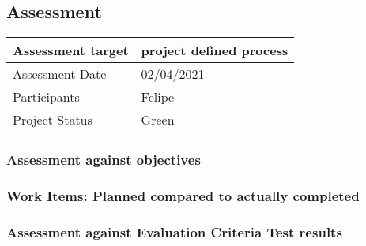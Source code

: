 \subsection*{Assessment}


\noindent\begin{tabular}{|l|l|}
\hline
Assessment target & project defined process \\\hline
Assessment Date & 02/04/2021\\\hline
Participants & Felipe\\\hline
Project Status & Green\\\hline
\end{tabular}

\subsubsection*{Assessment against objectives}

\subsubsection*{Work Items: Planned compared to actually completed}

\subsubsection*{Assessment against Evaluation Criteria Test results}

